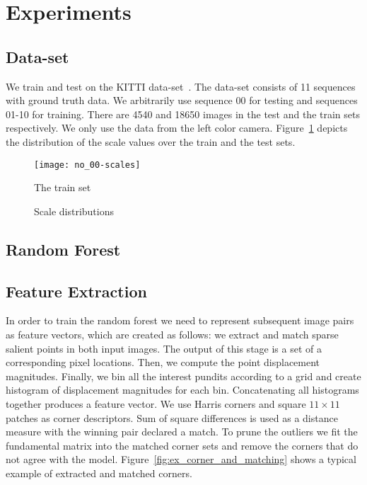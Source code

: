 \section{Experiments}

\subsection{Data-set}

We train and test on the KITTI data-set~\cite{geiger2013vision}.  The
data-set consists of 11 sequences with ground truth data.  We
arbitrarily use sequence 00 for testing and sequences 01-10 for
training.  There are 4540 and 18650 images in the test and the train
sets respectively. We only use the data from the left color camera.
Figure~\ref{fig:scales} depicts the distribution of the scale values
over the train and the test sets.

\begin{figure}[!ht]
  \texttt{[image: no\_00-scales]}
  \caption{The train set}
  \label{fig:stats-no_00}
  \caption{Scale distributions}
  \label{fig:scales}
\end{figure}

\subsection{Random Forest}

\subsection{Feature Extraction}\label{sec:features}

In order to train the random forest we need to represent subsequent
image pairs as feature vectors, which are created as follows: we
extract and match sparse salient points in both input images.  The
output of this stage is a set of a corresponding pixel locations.
Then, we compute the point displacement magnitudes.  Finally, we bin
all the interest pundits according to a grid and create histogram of
displacement magnitudes for each bin.  Concatenating all histograms
together produces a feature vector. We use Harris corners and square
$11\times 11$ patches as corner descriptors. Sum of square differences
is used as a distance measure with the winning pair declared a match.
To prune the outliers we fit the fundamental matrix into the matched
corner sets and remove the corners that do not agree with the model.
Figure~\ref{fig:ex_corner_and_matching} shows a typical example of
extracted and matched corners.


